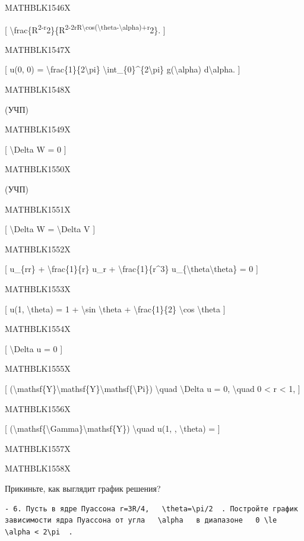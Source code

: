 \documentclass[
]{article}
\begin{document}
MATHBLK1546X

{[}
\textbackslash frac\{R\textsuperscript{2-r}2\}\{R\textsuperscript{2-2rR\textbackslash cos(\textbackslash theta-\textbackslash alpha)+r}2\}.
{]}

MATHBLK1547X

{[} u(0, 0) = \textbackslash frac\{1\}\{2\textbackslash pi\}
\textbackslash int\_\{0\}\^{}\{2\textbackslash pi\}
g(\textbackslash alpha) d\textbackslash alpha. {]}

MATHBLK1548X

(УЧП)

MATHBLK1549X

{[} \textbackslash Delta W = 0 {]}

MATHBLK1550X

(УЧП)

MATHBLK1551X

{[} \textbackslash Delta W = \textbackslash Delta V {]}

MATHBLK1552X

{[} u\_\{rr\} + \textbackslash frac\{1\}\{r\} u\_r +
\textbackslash frac\{1\}\{r\^{}3\}
u\_\{\textbackslash theta\textbackslash theta\} = 0 {]}

MATHBLK1553X

{[} u(1, \textbackslash theta) = 1 + \textbackslash sin
\textbackslash theta + \textbackslash frac\{1\}\{2\} \textbackslash cos
\textbackslash theta {]}

MATHBLK1554X

{[} \textbackslash Delta u = 0 {]}

MATHBLK1555X

{[}
(\textbackslash mathsf\{Y\}\textbackslash mathsf\{Y\}\textbackslash mathsf\{\textbackslash Pi\})
\textbackslash quad \textbackslash Delta u = 0, \textbackslash quad 0
\textless{} r \textless{} 1, {]}

MATHBLK1556X

{[}
(\textbackslash mathsf\{\textbackslash Gamma\}\textbackslash mathsf\{Y\})
\textbackslash quad u(1, , \textbackslash theta) = {]}

MATHBLK1557X

MATHBLK1558X

Прикиньте, как выглядит график решения?

\begin{verbatim}
- 6. Пусть в ядре Пуассона r=3R/4,   \theta=\pi/2  . Постройте график зависимости ядра Пуассона от угла   \alpha   в диапазоне   0 \le \alpha < 2\pi  .
\end{verbatim}
\end{document}
